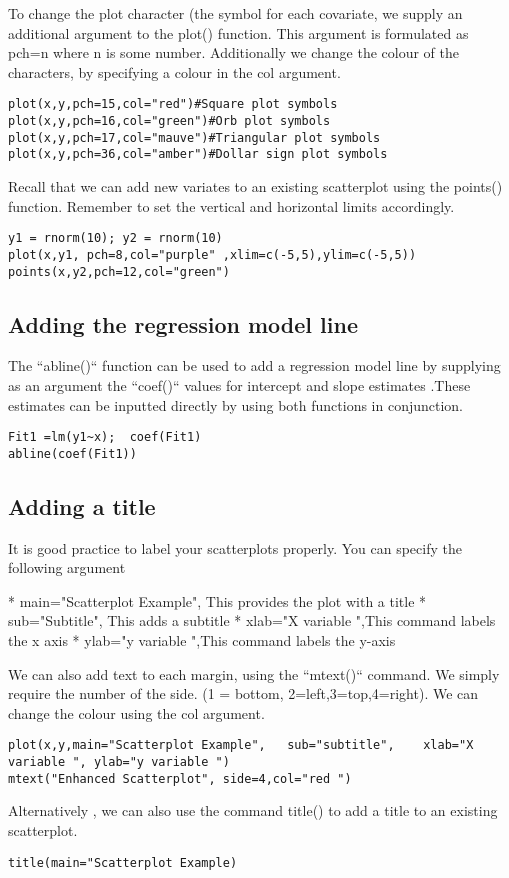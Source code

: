 \begin{itemize}
To change the plot character (the symbol for each covariate, we supply an additional argument to the plot() function.  This argument is formulated as pch=n where n is some number.
Additionally we change the colour of the characters, by specifying a colour in the col argument.
\large \begin{verbatim}
plot(x,y,pch=15,col="red")#Square plot symbols
plot(x,y,pch=16,col="green")#Orb plot symbols
plot(x,y,pch=17,col="mauve")#Triangular plot symbols
plot(x,y,pch=36,col="amber")#Dollar sign plot symbols
\end{verbatim}\large
Recall that we can add new variates to an existing scatterplot using the points() function. Remember to set the vertical and horizontal limits accordingly.
\large \begin{verbatim}
y1 = rnorm(10); y2 = rnorm(10)
plot(x,y1, pch=8,col="purple" ,xlim=c(-5,5),ylim=c(-5,5))
points(x,y2,pch=12,col="green")
\end{verbatim}\large
\subsection{Adding the regression model line}

The ``abline()`` function can be used to add a regression model line  by supplying as an argument the ``coef()`` values for intercept and slope estimates .These estimates can be inputted directly by using both functions in conjunction.

\large \begin{verbatim}
Fit1 =lm(y1~x);  coef(Fit1)
abline(coef(Fit1))
\end{verbatim}\large

\subsection{Adding a title }

It is good practice to label your scatterplots properly. You can specify the following argument
\begin{itemize}
* main="Scatterplot Example", This provides the plot with a title
* sub="Subtitle",                 This adds a subtitle
* xlab="X variable ",This command labels the x axis 
*    ylab="y variable ",This command labels the y-axis
\end{itemize}
We can also add text to each margin, using the ``mtext()`` command.  
We simply require the number of the side. (1 = bottom, 2=left,3=top,4=right). 
We can change the colour using the col argument.
\large \begin{verbatim}
plot(x,y,main="Scatterplot Example",   sub="subtitle",    xlab="X variable ", ylab="y variable ")
mtext("Enhanced Scatterplot", side=4,col="red ")
\end{verbatim}\large
Alternatively , we can also use the command title() to add a title to an existing scatterplot.
\large \begin{verbatim}
title(main="Scatterplot Example)
\end{verbatim}\large



\end{itemize}
